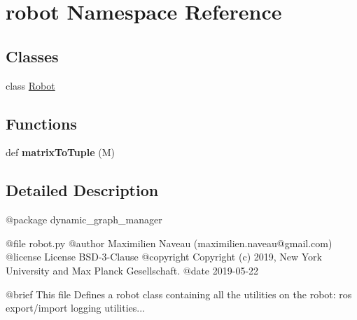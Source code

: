 \hypertarget{namespacerobot}{}\section{robot Namespace Reference}
\label{namespacerobot}
\subsection*{Classes}
\begin{DoxyCompactItemize}
\item 
class \hyperlink{classrobot_1_1Robot}{Robot}
\end{DoxyCompactItemize}
\subsection*{Functions}
\begin{DoxyCompactItemize}
\item 
def {\bfseries matrix\+To\+Tuple} (M)\hypertarget{namespacerobot_aedc9a4ae3bd753e6a31afe13c4a53aa9}{}\label{namespacerobot_aedc9a4ae3bd753e6a31afe13c4a53aa9}

\end{DoxyCompactItemize}


\subsection{Detailed Description}
\begin{DoxyVerb}@package dynamic_graph_manager

@file robot.py
@author Maximilien Naveau (maximilien.naveau@gmail.com)
@license License BSD-3-Clause
@copyright Copyright (c) 2019, New York University and Max Planck Gesellschaft.
@date 2019-05-22

@brief This file Defines a robot class containing all the utilities on the
robot: ros export/import logging utilities...\end{DoxyVerb}
 